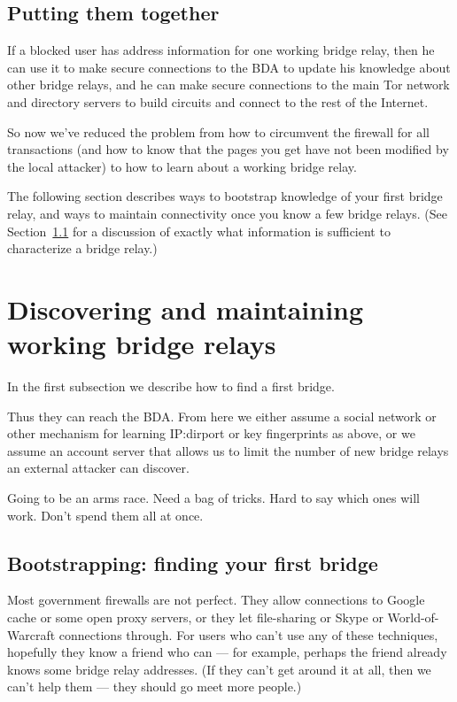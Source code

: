 \documentclass{llncs}
\begin{document}
\subsection{Putting them together}

If a blocked user has address information for one working bridge relay,
then he can use it to make secure connections to the BDA to update his
knowledge about other bridge
relays, and he can make secure connections to the main Tor network
and directory servers to build circuits and connect to the rest of
the Internet.

So now we've reduced the problem from how to circumvent the firewall
for all transactions (and how to know that the pages you get have not
been modified by the local attacker) to how to learn about a working
bridge relay.

The following section describes ways to bootstrap knowledge of your first
bridge relay, and ways to maintain connectivity once you know a few
bridge relays. (See Section~\ref{subsec:first-bridge} for a discussion
of exactly what information is sufficient to characterize a bridge relay.)

\section{Discovering and maintaining working bridge relays}
\label{sec:discovery}

In the first subsection we describe how to find a first bridge.

Thus they can reach the BDA. From here we either assume a social
network or other mechanism for learning IP:dirport or key fingerprints
as above, or we assume an account server that allows us to limit the
number of new bridge relays an external attacker can discover.

Going to be an arms race. Need a bag of tricks. Hard to say
which ones will work. Don't spend them all at once.

\subsection{Bootstrapping: finding your first bridge}
\label{subsec:first-bridge}

Most government firewalls are not perfect. They allow connections to
Google cache or some open proxy servers, or they let file-sharing or
Skype or World-of-Warcraft connections through.
For users who can't use any of these techniques, hopefully they know
a friend who can --- for example, perhaps the friend already knows some
bridge relay addresses.
(If they can't get around it at all, then we can't help them --- they
should go meet more people.)
\end{document}
